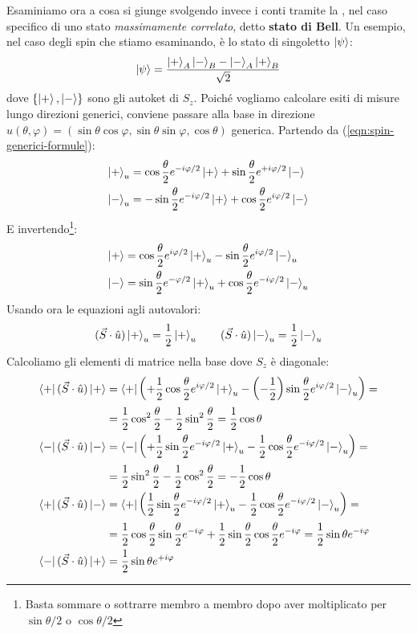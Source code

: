 \documentclass[../../FisicaTeorica.tex]{subfiles}
\begin{document}
Esaminiamo ora a cosa si giunge svolgendo invece i conti tramite la \MQ, nel caso specifico di uno stato \textit{massimamente correlato}, detto \textbf{stato di Bell}. Un esempio, nel caso degli spin che stiamo esaminando, è lo stato di singoletto $\Ket{\psi}$:
\begin{align*}
\Ket{\psi} = \frac{\Ket{+}_A \Ket{-}_B - \Ket{-}_A \Ket{+}_B}{\sqrt{2}}
\end{align*}
dove $\{\Ket{+}, \Ket{-}\}$ sono gli autoket di $S_z$. Poiché vogliamo calcolare esiti di misure lungo direzioni generici, conviene passare alla base in direzione $\hat{u}(\theta,\varphi)=(\sin\theta\cos\varphi, \sin\theta\sin\varphi, \cos\theta)$ generica. Partendo da (\ref{eqn:spin-generici-formule}):
\begin{align*}
\Ket{+}_u &= \cos\frac{\theta}{2}e^{-i\varphi/2}\Ket{+} + \sin\frac{\theta}{2}e^{+i\varphi/2}\Ket{-}\\
\Ket{-}_u &= -\sin\frac{\theta}{2}e^{-i\varphi/2}\Ket{+}+\cos\frac{\theta}{2}e^{i\varphi/2}\Ket{-}
\end{align*}
E invertendo\footnote{Basta sommare o sottrarre membro a membro dopo aver moltiplicato per $\sin\theta/2$ o $\cos\theta/2$}:
\begin{align*}
\Ket{+} &= \cos\frac{\theta}{2} e^{i\varphi/2} \Ket{+}_u - \sin\frac{\theta}{2}e^{i\varphi/2} \Ket{-}_u\\
\Ket{-} &= \sin \frac{\theta}{2} e^{-\varphi/2}\Ket{+}_u + \cos\frac{\theta}{2} e^{-i\varphi/2}\Ket{-}_u
\end{align*}
Usando ora le equazioni agli autovalori:
\begin{align*}
(\vec{S}\cdot \hat{u})\Ket{+}_u =\frac{1}{2}\Ket{+}_u\qquad (\vec{S}\cdot\hat{u})\Ket{-}_u = \frac{1}{2}\Ket{-}_u
\end{align*}
Calcoliamo gli elementi di matrice nella base dove $S_z$ è diagonale:
\begin{align*}
\Bra{+}(\vec{S}\cdot \hat{u})\Ket{+} &= \Bra{+}\left(+\frac{1}{2}\cos\frac{\theta}{2}e^{i\varphi/2}\Ket{+}_u -\left(-\frac{1}{2}\right) \sin\frac{\theta}{2}e^{i\varphi/2}\Ket{-}_u\right)=\\
&=\frac{1}{2}\cos^2\frac{\theta}{2}-\frac{1}{2}\sin^2\frac{\theta}{2}=\frac{1}{2}\cos\theta\\
\Bra{-}(\vec{S}\cdot \hat{u})\Ket{-} &= \Bra{-}\left(+\frac{1}{2}\sin\frac{\theta}{2}e^{-i\varphi/2}\Ket{+}_u - \frac{1}{2}\cos\frac{\theta}{2}e^{-i\varphi/2}\Ket{-}_u\right)=\\
&=\frac{1}{2}\sin^2\frac{\theta}{2}-\frac{1}{2}\cos^2\frac{\theta}{2} = -\frac{1}{2}\cos\theta\\
\Bra{+}(\vec{S}\cdot \hat{u})\Ket{-} &= \Bra{+}\left(\frac{1}{2}\sin\frac{\theta}{2}e^{-i\varphi/2}\Ket{+}_u - \frac{1}{2}\cos\frac{\theta}{2}e^{-i\varphi/2}\Ket{-}_u\right)=\\
&=\frac{1}{2}\cos\frac{\theta}{2}\sin\frac{\theta}{2}e^{-i\varphi} + \frac{1}{2}\sin\frac{\theta}{2}\cos\frac{\theta}{2}e^{-i\varphi} = \frac{1}{2}\sin\theta e^{-i\varphi}\\
\Bra{-}(\vec{S}\cdot \hat{u})\Ket{+}&=\frac{1}{2}\sin\theta e^{+i\varphi}
\end{align*}
\end{document}
